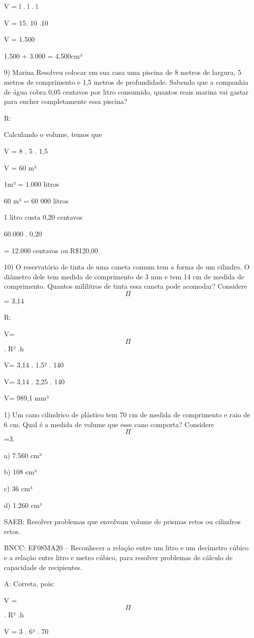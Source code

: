 V = l . l . l

V = 15. 10 .10

V = 1.500

1.500 + 3.000 = 4.500cm³

9) Marina Resolveu colocar em sua casa uma piscina de 8 metros de
largura, 5 metros de comprimento e 1,5 metros de profundidade. Sabendo
que a companhia de água cobra 0,05 centavos por litro consumido, quantos
reais marina vai gastar para encher completamente essa piscina?

R:

Calculando o volume, temos que

V = 8 . 5 . 1,5

V = 60 m³

1m³ = 1.000 litros

60 m³ = 60 000 litros

1 litro custa 0,20 centavos

60.000 . 0,20

= 12.000 centavos ou R\$120,00

10) O reservatório de tinta de uma caneta comum tem a forma de um
cilindro. O diâmetro dele tem medida de comprimento de 3 mm e tem 14 cm
de medida de comprimento. Quantos mililitros de tinta essa caneta pode
acomodar? Considere \[\Pi\] = 3,14

R:

V= \[\Pi\] . R² .h

V= 3,14 . 1,5² . 140

V= 3,14 . 2,25 . 140

V= 989,1 mm³


1) Um cano cilíndrico de plástico tem 70 cm de medida de comprimento e
raio de 6 cm. Qual é a medida de volume que esse cano comporta?
Considere \[\Pi\]=3.

a) 7.560 cm³

b) 108 cm³

c) 36 cm³

d) 1.260 cm³

SAEB: Resolver problemas que envolvam volume de prismas retos ou
cilindros retos.

BNCC: EF08MA20 -- Reconhecer a relação entre um litro e um decímetro
cúbico e a relação entre litro e metro cúbico, para resolver problemas
de cálculo de capacidade de recipientes.

A: Correta, pois:

V = \[\Pi\] . R² .h

V = 3 . 6² . 70

